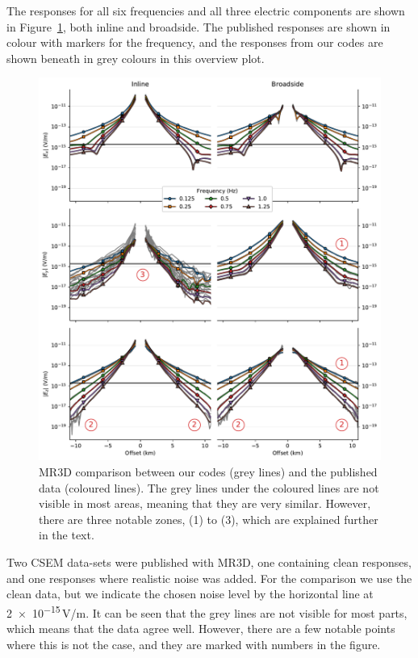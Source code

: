 \documentclass[onecolumn,extra,camera]{gji}
\begin{document}
The responses for all six frequencies and all three electric components are shown in Figure~\ref{fig:results-marlim-responses}, both inline and broadside. The published responses are shown in colour with markers for the frequency, and the responses from our codes are shown beneath in grey colours in this overview plot.
%
\begin{figure}
  \centering
  \includegraphics[width=.9\linewidth]{figures/results-marlim-responses}
  \caption{MR3D comparison between our codes (grey lines) and the published data (coloured lines). The grey lines under the coloured lines are not visible in most areas, meaning that they are very similar. However, there are three notable zones, (1) to (3), which are explained further in the text.}
  \label{fig:results-marlim-responses}
\end{figure}
%
Two CSEM data-sets were published with MR3D, one containing clean responses, and one responses where realistic noise was added. For the comparison we use the clean data, but we indicate the chosen noise level by the horizontal line at \num{2e-15}\,V/m. It can be seen that the grey lines are not visible for most parts, which means that the data agree well. However, there are a few notable points where this is not the case, and they are marked with numbers in the figure.
\end{document}
